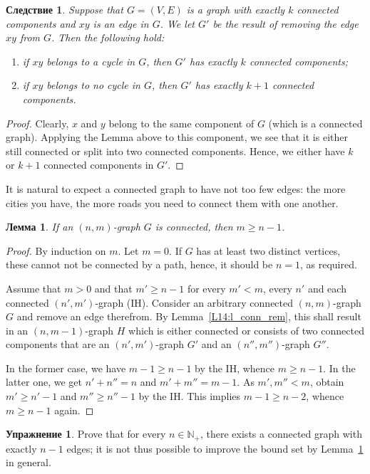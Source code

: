 \documentclass[12pt,notitlepage]{article}
\theoremstyle{plain}
\newtheorem{lemma}[thm]{Лемма}
\newtheorem{corr}[thm]{Следствие}
\theoremstyle{definition}
\newtheorem{exc}[thm]{Упражнение}
\theoremstyle{plain}
\newcommand{\N}{\mathbb{N}}
\newcommand{\1}{\mathbf{1}}
\newcommand{\0}{\mathbf{0}}
\begin{document}
\begin{corr}\label{L14:c_conn_rem}
	Suppose that $G = (V, E)$ is a graph with exactly $k$ connected components and $xy$ is an edge in $G$. We let $G'$ be the result of removing the edge $xy$ from $G$. Then the following hold:
	\begin{enumerate}
		\item if $xy$ belongs to a cycle in $G$, then $G'$ has exactly $k$ connected components;
		\item if $xy$ belongs to no cycle in $G$, then $G'$ has exactly $k + 1$ connected components.
	\end{enumerate}
\end{corr}
\begin{proof}
	Clearly, $x$ and $y$ belong to the same component of $G$ (which is a connected graph). Applying the Lemma above to this component, we see that it is either still connected or split into two connected components. Hence, we either have $k$ or $k + 1$ connected components in $G'$.
\end{proof}

It is natural to expect a connected graph to have not too few edges: the more cities you have, the more roads you need to connect them with one another.
\begin{lemma}\label{L14:conn_edge_num}
	If an $(n,m)$-graph $G$ is connected, then $m \geq n - 1$.
\end{lemma}
\begin{proof}
	By induction on $m$. Let $m = 0$. If $G$ has at least two distinct vertices, these cannot not be connected by a path, hence, it should be $n = 1$, as required.
	
	Assume that $m > 0$ and that $m' \geq n - 1$ for every $m' < m$, every $n'$ and each connected $(n',m')$-graph (IH). Consider an arbitrary connected $(n, m)$-graph $G$ and remove an edge therefrom. By Lemma~\ref{L14:l_conn_rem}, this shall result in an $(n,m - 1)$-graph $H$ which is either connected or consists of two connected components that are an $(n',m')$-graph $G'$ and an $(n'', m'')$-graph $G''$.
	
	In the former case, we have $m - 1 \geq n - 1$ by the IH, whence $m \geq n - 1$. In the latter one, we get $n' + n'' = n$ and $m' + m'' = m - 1$. As $m', m'' < m$, obtain $m' \geqslant n' - 1$ and $m'' \geqslant n'' - 1$ by the IH. This implies $m - 1 \geq n - 2$, whence $m \geq n - 1$ again.
\end{proof}

\begin{exc}
	Prove that for every $n \in \N_+$, there exists a connected graph with exactly $n - 1$ edges; it is not thus possible to improve the bound set by Lemma~\ref{L14:conn_edge_num} in general.
\end{exc}
\end{document}
